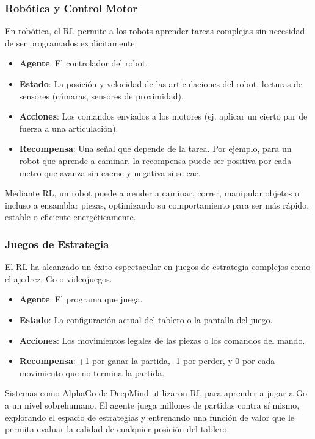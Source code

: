 \documentclass[12pt,a4paper]{book}
\begin{document}
\subsubsection{Robótica y Control Motor}

En robótica, el RL permite a los robots aprender tareas complejas sin necesidad de ser programados explícitamente.

\begin{itemize}
    \item \textbf{Agente}: El controlador del robot.
    \item \textbf{Estado}: La posición y velocidad de las articulaciones del robot, lecturas de sensores (cámaras, sensores de proximidad).
    \item \textbf{Acciones}: Los comandos enviados a los motores (ej. aplicar un cierto par de fuerza a una articulación).
    \item \textbf{Recompensa}: Una señal que depende de la tarea. Por ejemplo, para un robot que aprende a caminar, la recompensa puede ser positiva por cada metro que avanza sin caerse y negativa si se cae.
\end{itemize}

Mediante RL, un robot puede aprender a caminar, correr, manipular objetos o incluso a ensamblar piezas, optimizando su comportamiento para ser más rápido, estable o eficiente energéticamente.

\subsubsection{Juegos  de Estrategia}

El RL ha alcanzado un éxito espectacular en juegos de estrategia complejos como el ajedrez, Go o videojuegos.

\begin{itemize}
    \item \textbf{Agente}: El programa que juega.
    \item \textbf{Estado}: La configuración actual del tablero o la pantalla del juego.
    \item \textbf{Acciones}: Los movimientos legales de las piezas o los comandos del mando.
    \item \textbf{Recompensa}: +1 por ganar la partida, -1 por perder, y 0 por cada movimiento que no termina la partida.
\end{itemize}

Sistemas como AlphaGo de DeepMind utilizaron RL para aprender a jugar a Go a un nivel sobrehumano. El agente juega millones de partidas contra sí mismo, explorando el espacio de estrategias y entrenando una función de valor que le permita evaluar la calidad de cualquier posición del tablero.
\color{red}
\end{document}
